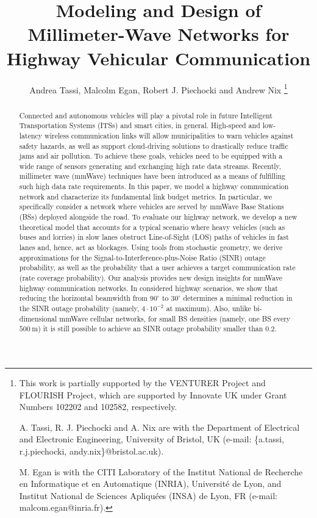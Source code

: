 \documentclass[10pt,journal,a4paper]{IEEEtran}
\begin{document}
\title{Modeling and Design of Millimeter-Wave Networks for Highway Vehicular Communication}

\author{Andrea Tassi, Malcolm Egan, Robert J. Piechocki and Andrew Nix
\thanks{
This work is partially supported by the \mbox{VENTURER} Project and \mbox{FLOURISH} Project, which are supported by Innovate UK under Grant Numbers 102202 and 102582, respectively.

A. Tassi, R. J. Piechocki and A. Nix are with the Department of Electrical and Electronic Engineering, University of Bristol, UK (e-mail: \{\mbox{a.tassi}, \mbox{r.j.piechocki}, \mbox{andy.nix}\}@bristol.ac.uk).

M. Egan is with the CITI Laboratory of the Institut National de Recherche en Informatique et en Automatique (INRIA), Universit{\'e} de Lyon, and Institut National de Sciences Apliqu{\'e}es (INSA) de Lyon, FR (e-mail: \mbox{malcom.egan}@inria.fr).}}

\maketitle

\begin{abstract}
Connected and autonomous vehicles will play a pivotal role in future Intelligent Transportation Systems (ITSs) and smart cities, in general. High-speed and low-latency wireless communication links will allow municipalities to warn vehicles against safety hazards, as well as support cloud-driving solutions to drastically reduce traffic jams and air pollution. To achieve these goals, vehicles need to be equipped with a wide range of sensors generating and exchanging high rate data streams. Recently, millimeter wave (mmWave) techniques have been introduced as a means of fulfilling such high data rate requirements. In this paper, we model a highway communication network and characterize its fundamental link budget metrics. In particular, we specifically consider a network where vehicles are served by mmWave Base Stations (BSs) deployed alongside the road. To evaluate our highway network, we develop a new theoretical model that accounts for a typical scenario where heavy vehicles (such as buses and lorries) in slow lanes obstruct Line-of-Sight (LOS) paths of vehicles in fast lanes and, hence, act as blockages. Using tools from stochastic geometry, we derive approximations for the Signal-to-Interference-plus-Noise Ratio (SINR) outage probability, as well as the probability that a user achieves a target communication rate (rate coverage probability). Our analysis provides new design insights for mmWave highway communication networks.
{In considered highway scenarios, we show that reducing the horizontal beamwidth from $90^\circ$ to $30^\circ$ determines a minimal reduction in the SINR outage probability (namely, $4 \cdot 10^{-2}$ at maximum). Also, unlike bi-dimensional mmWave cellular networks, for small BS densities (namely, one BS every $\SI{500}{\meter}$) it is still possible to achieve an SINR outage probability smaller than $0.2$.}
\end{abstract}
\end{document}
